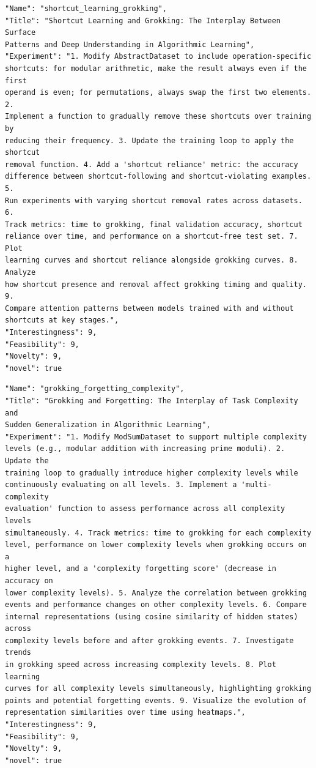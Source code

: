 \begin{tcolorbox}[breakable,colback=blue!5!white, colframe=blue!75!black, title=Idea 49/50 - \texttt{shortcut\_learning\_grokking}]
\small
\begin{verbatim}
"Name": "shortcut_learning_grokking",
"Title": "Shortcut Learning and Grokking: The Interplay Between Surface
Patterns and Deep Understanding in Algorithmic Learning",
"Experiment": "1. Modify AbstractDataset to include operation-specific
shortcuts: for modular arithmetic, make the result always even if the first
operand is even; for permutations, always swap the first two elements. 2.
Implement a function to gradually remove these shortcuts over training by
reducing their frequency. 3. Update the training loop to apply the shortcut
removal function. 4. Add a 'shortcut reliance' metric: the accuracy
difference between shortcut-following and shortcut-violating examples. 5.
Run experiments with varying shortcut removal rates across datasets. 6.
Track metrics: time to grokking, final validation accuracy, shortcut
reliance over time, and performance on a shortcut-free test set. 7. Plot
learning curves and shortcut reliance alongside grokking curves. 8. Analyze
how shortcut presence and removal affect grokking timing and quality. 9.
Compare attention patterns between models trained with and without
shortcuts at key stages.",
"Interestingness": 9,
"Feasibility": 9,
"Novelty": 9,
"novel": true
\end{verbatim}
\end{tcolorbox}

\begin{tcolorbox}[breakable,colback=blue!5!white, colframe=blue!75!black, title=Idea 50/50 - \texttt{grokking\_forgetting\_complexity}]
\small
\begin{verbatim}
"Name": "grokking_forgetting_complexity",
"Title": "Grokking and Forgetting: The Interplay of Task Complexity and
Sudden Generalization in Algorithmic Learning",
"Experiment": "1. Modify ModSumDataset to support multiple complexity
levels (e.g., modular addition with increasing prime moduli). 2. Update the
training loop to gradually introduce higher complexity levels while
continuously evaluating on all levels. 3. Implement a 'multi-complexity
evaluation' function to assess performance across all complexity levels
simultaneously. 4. Track metrics: time to grokking for each complexity
level, performance on lower complexity levels when grokking occurs on a
higher level, and a 'complexity forgetting score' (decrease in accuracy on
lower complexity levels). 5. Analyze the correlation between grokking
events and performance changes on other complexity levels. 6. Compare
internal representations (using cosine similarity of hidden states) across
complexity levels before and after grokking events. 7. Investigate trends
in grokking speed across increasing complexity levels. 8. Plot learning
curves for all complexity levels simultaneously, highlighting grokking
points and potential forgetting events. 9. Visualize the evolution of
representation similarities over time using heatmaps.",
"Interestingness": 9,
"Feasibility": 9,
"Novelty": 9,
"novel": true
\end{verbatim}
\end{tcolorbox}

